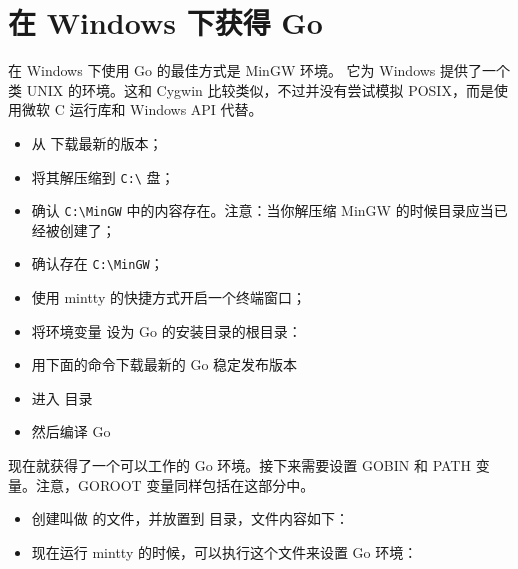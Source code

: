 \section{在 Windows 下获得 Go}
在 Windows 下使用 Go 的最佳方式是 MinGW \cite{go_windows} 环境。 
它为 Windows 提供了一个类 UNIX 的环境。这和 Cygwin 比较类似，不过并没有尝试模拟 
POSIX，而是使用微软 C 运行库和 Windows API 代替。
\begin{itemize}
\item 从 \cite{go_windows} 下载最新的版本；
\item 将其解压缩到 \verb|C:\| 盘；
\item 确认 \verb|C:\MinGW| 中的内容存在。注意：当你解压缩 MinGW 的时候目录应当已经被创建了；
\item 确认存在 \verb|C:\MinGW|；
\item 使用 mintty 的快捷方式开启一个终端窗口；
\item 将环境变量  设为 Go 的安装目录的根目录：
\begin{display}
\pr {}
\end{display}
\item 用下面的命令下载最新的 Go 稳定发布版本
\begin{display}
\pr {}
\end{display}
\item 进入  目录
\begin{display}
\pr {}
\end{display}
\item 然后编译 Go
\begin{display}
\pr {}
\end{display}
\end{itemize}
现在就获得了一个可以工作的 Go 环境。接下来需要设置 GOBIN 和 PATH 变量。注意，GOROOT 变量同样包括在这部分中。

\begin{itemize}
\item 创建叫做  的文件，并放置到  目录，文件内容如下：
\item 现在运行 mintty 的时候，可以执行这个文件来设置 Go 环境：
\begin{display}
\pr {}
\end{display}
\end{itemize}

